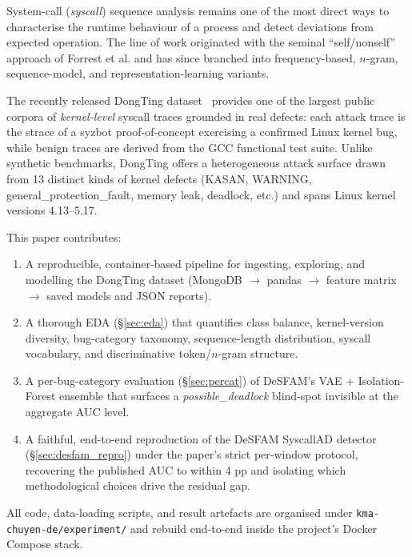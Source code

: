 \documentclass[conference,10pt]{IEEEtran}
\begin{document}
System-call (\emph{syscall}) sequence analysis remains one of the most direct
ways to characterise the runtime behaviour of a process and detect deviations
from expected operation. The line of work originated with the seminal
``self/nonself'' approach of Forrest et al.\cite{forrest1996sense} and has
since branched into frequency-based, $n$-gram, sequence-model, and
representation-learning variants.

The recently released DongTing dataset~\cite{duan2023dongting} provides one
of the largest public corpora of \emph{kernel-level} syscall traces grounded
in real defects: each attack trace is the strace of a syzbot
proof-of-concept exercising a confirmed Linux kernel bug, while benign
traces are derived from the GCC functional test suite. Unlike synthetic
benchmarks, DongTing offers a heterogeneous attack surface drawn from 13
distinct kinds of kernel defects (KASAN, WARNING, general\_protection\_fault,
memory leak, deadlock, etc.) and spans Linux kernel versions 4.13--5.17.

This paper contributes:
\begin{enumerate}
  \item A reproducible, container-based pipeline for ingesting, exploring,
        and modelling the DongTing dataset (MongoDB $\rightarrow$ pandas
        $\rightarrow$ feature matrix $\rightarrow$ saved models and JSON
        reports).
  \item A thorough EDA (\S\ref{sec:eda}) that quantifies class balance,
        kernel-version diversity, bug-category taxonomy, sequence-length
        distribution, syscall vocabulary, and discriminative
        token/$n$-gram structure.
  \item A per-bug-category evaluation (\S\ref{sec:percat}) of DeSFAM's
        VAE + Isolation-Forest ensemble that surfaces a
        \emph{possible\_deadlock} blind-spot invisible at the aggregate
        AUC level.
  \item A faithful, end-to-end reproduction of the DeSFAM SyscallAD
        detector (\S\ref{sec:desfam_repro}) under the paper's strict
        per-window protocol, recovering the published AUC to within 4 pp
        and isolating which methodological choices drive the residual
        gap.
\end{enumerate}

All code, data-loading scripts, and result artefacts are organised under
\texttt{kma-chuyen-de/experiment/} and rebuild end-to-end inside the
project's Docker Compose stack.
\end{document}
